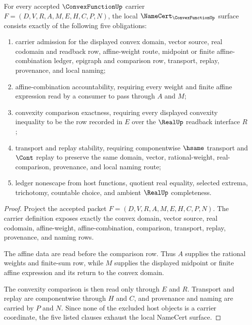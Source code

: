 \begin{theorem}
\label{thm:convex-function-namecert-obligations}
For every accepted $\ConvexFunctionUp$ carrier $F=(D,V,R,A,M,E,H,C,P,N)$, the local $\NameCert_{\ConvexFunctionUp}$ surface consists exactly of the following five obligations:
\begin{enumerate}
\item carrier admission for the displayed convex domain, vector source, real codomain and readback row, affine-weight route, midpoint or finite affine-combination ledger, epigraph and comparison row, transport, replay, provenance, and local naming;
\item affine-combination accountability, requiring every weight and finite affine expression read by a consumer to pass through $A$ and $M$;
\item convexity comparison exactness, requiring every displayed convexity inequality to be the row recorded in $E$ over the $\RealUp$ readback interface $R$;
\item transport and replay stability, requiring componentwise $\hsame$ transport and $\Cont$ replay to preserve the same domain, vector, rational-weight, real-comparison, provenance, and local naming route;
\item ledger nonescape from host functions, quotient real equality, selected extrema, trichotomy, countable choice, and ambient $\RealUp$ completeness.
\end{enumerate}
\end{theorem}
\begin{proof}
Project the accepted packet $F=(D,V,R,A,M,E,H,C,P,N)$. The carrier definition exposes exactly the convex domain, vector source, real codomain, affine-weight, affine-combination, comparison, transport, replay, provenance, and naming rows.

The affine data are read before the comparison row. Thus $A$ supplies the rational weights and finite-sum row, while $M$ supplies the displayed midpoint or finite affine expression and its return to the convex domain.

The convexity comparison is then read only through $E$ and $R$. Transport and replay are componentwise through $H$ and $C$, and provenance and naming are carried by $P$ and $N$. Since none of the excluded host objects is a carrier coordinate, the five listed clauses exhaust the local NameCert surface.
\end{proof}

